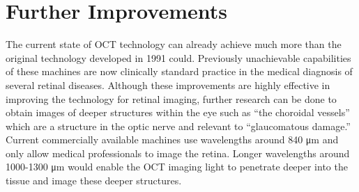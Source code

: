 
\section{Further Improvements}
The current state of OCT technology can already achieve much more than the original technology developed in 1991 could.  Previously unachievable capabilities of these machines are now clinically standard practice in the medical diagnosis of several retinal diseases.  Although these improvements are highly effective in improving the technology for retinal imaging, further research can be done to obtain images of deeper structures within the eye such as “the choroidal vessels” \cite{} which are a structure in the optic nerve and relevant to “glaucomatous damage.” \cite{}  Current commercially available machines use wavelengths around 840 μm and only allow medical professionals to image the retina.  Longer wavelengths around 1000-1300 μm would enable the OCT imaging light to penetrate deeper into the tissue and image these deeper structures. \cite{}
